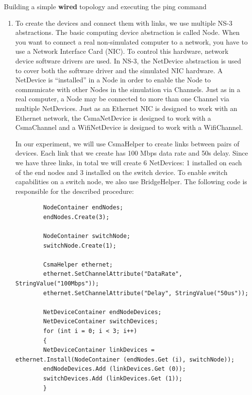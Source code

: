 \begin{exercise}{Building a simple \textbf{wired} topology and executing the ping command}
\begin{enumerate}
		If we do not specify any arguments after ping-example, the variables will not be changed. That means that their default values will be used. If we want to change the value of a particular variable, we can always specify its value in the run command:
		\begin{cmdblock}[gobble=2]
		\end{cmdblock}
		
		
		\item To create the devices and connect them with links, we use multiple NS-3 abstractions. The basic computing device abstraction is called Node. When you want to connect a real non-simulated computer to a network, you have to use a Network Interface Card (NIC). To control this hardware, network device software drivers are used. In NS-3, the NetDevice abstraction is used to cover both the software driver and the simulated NIC hardware. A NetDevice is “installed” in a Node in order to enable the Node to communicate with other Nodes in the simulation via Channels. Just as in a real computer, a Node may be connected to more than one Channel via multiple NetDevices. Just as an Ethernet NIC is designed to work with an Ethernet network, the CsmaNetDevice is designed to work with a CsmaChannel and a WifiNetDevice is designed to work with a WifiChannel.
		
		In our experiment, we will use CsmaHelper to create links between pairs of devices. Each link that we create has 100 Mbps data rate and 50\textmu s delay. Since we have three links, in total we will create 6 NetDevices: 1 installed on each of the end nodes and 3 installed on the switch device. To enable switch capabilities on a switch node, we also use BridgeHelper. The following code is responsible for the described procedure:
		\begin{lstlisting}
		NodeContainer endNodes;
		endNodes.Create(3);
		
		NodeContainer switchNode;
		switchNode.Create(1);
		
		CsmaHelper ethernet;
		ethernet.SetChannelAttribute("DataRate", StringValue("100Mbps"));
		ethernet.SetChannelAttribute("Delay", StringValue("50us"));
		
		NetDeviceContainer endNodeDevices;
		NetDeviceContainer switchDevices;
		for (int i = 0; i < 3; i++)
		{
		NetDeviceContainer linkDevices = ethernet.Install(NodeContainer (endNodes.Get (i), switchNode));
		endNodeDevices.Add (linkDevices.Get (0));
		switchDevices.Add (linkDevices.Get (1));
		}
		

\end{lstlisting}
\end{enumerate}
\end{exercise}
